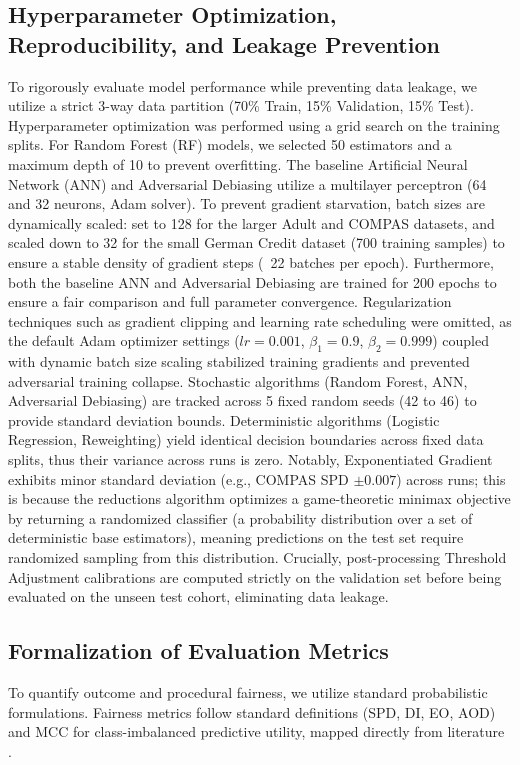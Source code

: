 \documentclass[conference]{IEEEtran}
\begin{document}
\subsection{Hyperparameter Optimization, Reproducibility, and Leakage Prevention}
To rigorously evaluate model performance while preventing data leakage, we utilize a strict 3-way data partition (70\% Train, 15\% Validation, 15\% Test). Hyperparameter optimization was performed using a grid search on the training splits. For Random Forest (RF) models, we selected 50 estimators and a maximum depth of 10 to prevent overfitting. The baseline Artificial Neural Network (ANN) and Adversarial Debiasing utilize a multilayer perceptron (64 and 32 neurons, Adam solver). To prevent gradient starvation, batch sizes are dynamically scaled: set to 128 for the larger Adult and COMPAS datasets, and scaled down to 32 for the small German Credit dataset (700 training samples) to ensure a stable density of gradient steps (~22 batches per epoch). Furthermore, both the baseline ANN and Adversarial Debiasing are trained for 200 epochs to ensure a fair comparison and full parameter convergence. Regularization techniques such as gradient clipping and learning rate scheduling were omitted, as the default Adam optimizer settings ($lr=0.001$, $\beta_1=0.9$, $\beta_2=0.999$) coupled with dynamic batch size scaling stabilized training gradients and prevented adversarial training collapse. Stochastic algorithms (Random Forest, ANN, Adversarial Debiasing) are tracked across 5 fixed random seeds (42 to 46) to provide standard deviation bounds. Deterministic algorithms (Logistic Regression, Reweighting) yield identical decision boundaries across fixed data splits, thus their variance across runs is zero. Notably, Exponentiated Gradient exhibits minor standard deviation (e.g., COMPAS SPD $\pm 0.007$) across runs; this is because the reductions algorithm optimizes a game-theoretic minimax objective by returning a randomized classifier (a probability distribution over a set of deterministic base estimators), meaning predictions on the test set require randomized sampling from this distribution. Crucially, post-processing Threshold Adjustment calibrations are computed strictly on the validation set before being evaluated on the unseen test cohort, eliminating data leakage.

\subsection{Formalization of Evaluation Metrics}
To quantify outcome and procedural fairness, we utilize standard probabilistic formulations. Fairness metrics follow standard definitions (SPD, DI, EO, AOD) and MCC for class-imbalanced predictive utility, mapped directly from literature \cite{R20}.
\end{document}
